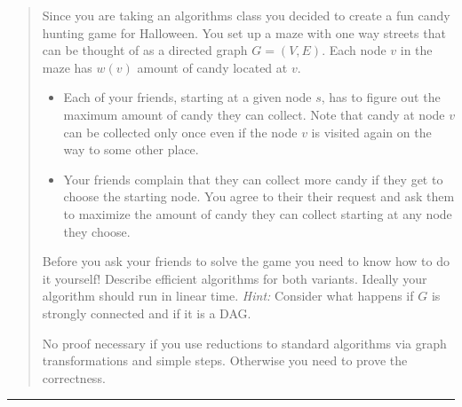 \documentclass[11pt]{article}
\begin{document}

\begin{quote}
Since you are taking an algorithms class you decided to create a
  fun candy hunting game for Halloween. You set up a maze with one
  way streets that can be thought of as a directed graph
  $G=(V,E)$. Each node $v$ in the maze has $w(v)$ amount of candy
  located at $v$.
  \begin{itemize}
  \item Each of your friends, starting at a given node $s$, has to
    figure out the maximum amount of candy they can collect. Note that
    candy at node $v$ can be collected only once even if the node $v$
    is visited again on the way to some other place.
  \item Your friends complain that they can collect more candy if they
    get to choose the starting node. You agree to their their request
    and ask them to maximize the amount of candy they can collect
    starting at any node they choose.
  \end{itemize}
  Before you ask your friends to solve the game you need to know how
  to do it yourself!  Describe efficient algorithms for both variants.
  Ideally your algorithm should run in linear time.
  {\em Hint:} Consider what happens if $G$ is strongly connected and
  if it is a DAG.

  No proof necessary if you use reductions to standard algorithms via
  graph transformations and simple steps. Otherwise you need to prove
  the correctness.
\end{quote}
\hrule
\end{document}
